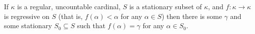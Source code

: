 \documentclass[12pt]{article}
\begin{document}
If $\kappa$ is a regular, uncountable cardinal, $S$ is a stationary subset of $\kappa$, and $f:\kappa\rightarrow\kappa$ is regressive on $S$ (that is, $f(\alpha)<\alpha$ for any $\alpha\in S$) then there is some $\gamma$ and some stationary $S_0\subseteq S$ such that $f(\alpha)=\gamma$ for any $\alpha\in S_0$.
\end{document}
